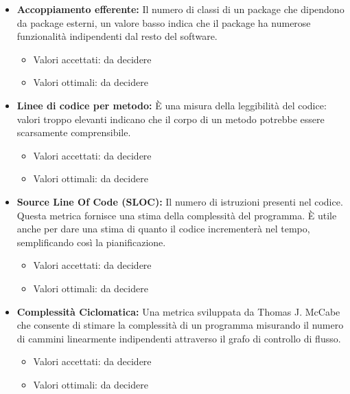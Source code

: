 \documentclass[a4paper]{article}
\begin{document}
\begin{itemize}
					\item \textbf{Accoppiamento efferente:}
						Il numero di classi di un package che dipendono da package esterni, un valore basso indica che il package ha 
						numerose funzionalità indipendenti dal resto del software.
						\begin{itemize}
							\item Valori accettati: da decidere
							\item Valori ottimali: da decidere
						\end{itemize}
						
					\item \textbf{Linee di codice per metodo:}
						È una misura della leggibilità del codice: valori troppo elevanti indicano che il corpo di un metodo
						potrebbe essere scarsamente comprensibile.
						\begin{itemize}
							\item Valori accettati: da decidere
							\item Valori ottimali: da decidere
						\end{itemize}
						
					\item \textbf{Source Line Of Code (SLOC):}
						Il numero di istruzioni presenti nel codice. Questa metrica fornisce una stima della complessità del programma.
						È utile anche per dare una stima di quanto il codice incrementerà nel tempo, semplificando così la
						pianificazione.
						\begin{itemize}
							\item Valori accettati: da decidere
							\item Valori ottimali: da decidere
						\end{itemize}
					
					\item \textbf{Complessità Ciclomatica:}
						Una metrica sviluppata da Thomas J. McCabe che consente di stimare la complessità di un programma misurando
						il numero di cammini linearmente indipendenti attraverso il grafo di controllo di flusso.
						\begin{itemize}
							\item Valori accettati: da decidere
							\item Valori ottimali: da decidere
						\end{itemize}
					
					
					
			\end{itemize}
			
\end{document}
